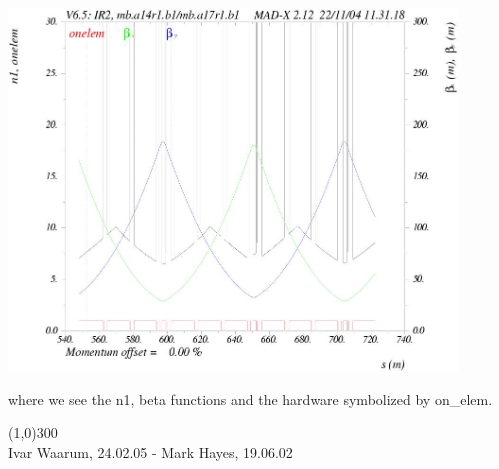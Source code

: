 \begin{itemize}
\includegraphics[width=450px]{Introduction/aperexample.jpg}%

 where we see the n1, beta functions and the hardware symbolized by on\_elem.    

\line(1,0){300}
\\
 Ivar Waarum, 24.02.05  -  Mark Hayes, 19.06.02 
\end{itemize}

